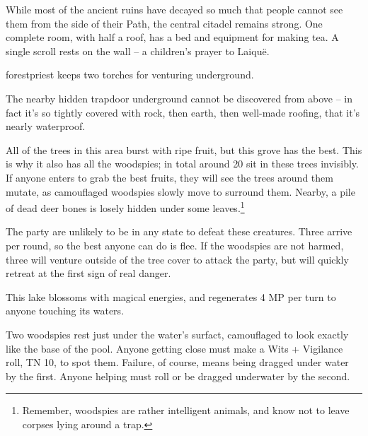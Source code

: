 \label{lost_city_map}

\begin{multicols}{2}

\label{lost_citadel}
While most of the ancient ruins have decayed so much that people cannot see them from the side of their Path, the central citadel remains strong.
One complete room,  with half a roof, has a bed and equipment for making tea.
A single scroll rests on the wall -- a children's prayer to Laiqu\"{e}.

\Gls{forestpriest} keeps two torches for venturing underground.

The nearby hidden trapdoor underground cannot be discovered from above -- in fact it's so tightly covered with rock, then earth, then well-made roofing, that it's nearly waterproof.


All of the trees in this area burst with ripe fruit, but this grove has the best.  This is why it also has all the woodspies; in total around 20 sit in these trees invisibly.  If anyone enters to grab the best fruits, they will see the trees around them mutate, as camouflaged woodspies slowly move to surround them.  Nearby, a pile of dead deer bones is losely hidden under some leaves.\footnote{Remember, woodspies are rather intelligent animals, and know not to leave corpses lying around a trap.}


The party are unlikely to be in any state to defeat these creatures.  Three arrive per round, so the best anyone can do is flee.  If the woodspies are not harmed, three will venture outside of the tree cover to attack the party, but will quickly retreat at the first sign of real danger.

\woodspy


This lake blossoms with magical energies, and regenerates 4 MP per turn to anyone touching its waters.

Two woodspies rest just under the water's surfact, camouflaged to look exactly like the base of the pool.  Anyone getting close must make a Wits + Vigilance roll, TN 10, to spot them.  Failure, of course, means being dragged under water by the first.  Anyone helping must roll or be dragged underwater by the second.



\end{multicols}
